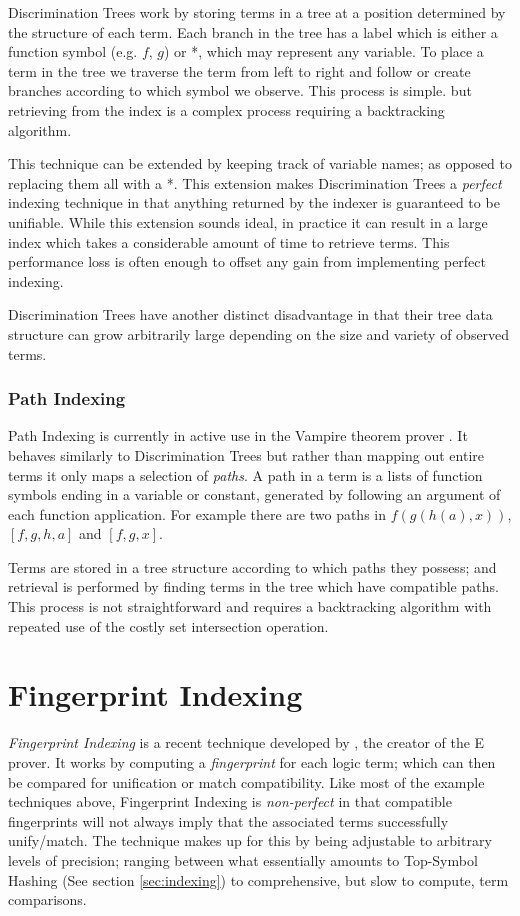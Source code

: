 Discrimination Trees work by storing terms in a tree at a position determined by the structure
of each term. Each branch in the tree has a label which is either a function symbol
(e.g. $f$, $g$) or *, which may represent any variable. To place a term in the tree
we traverse the term from left to right and follow or create branches according to
which symbol we observe. This process is simple. but retrieving from the index is a
complex process requiring a backtracking algorithm.

This technique can be extended by keeping track of variable names; as opposed to
replacing them all with a *. This extension makes Discrimination Trees a \emph{perfect} indexing technique in that anything
returned by the indexer is guaranteed to be unifiable\cite{mccune}. While this extension sounds
ideal, in practice it can result in a large index which takes
a considerable amount of time to retrieve terms. This performance
loss is often enough to offset any gain from implementing perfect indexing.

Discrimination Trees have another distinct disadvantage in that their tree data
structure can grow arbitrarily large depending on the size and variety of observed terms.

\subsubsection{Path Indexing}

Path Indexing is currently in active use in the Vampire theorem prover \cite{vampire}.
It behaves similarly to Discrimination Trees but rather than mapping out entire terms
it only maps a selection of \emph{paths}. A path in a term is a lists of function symbols
ending in a variable or constant, generated by following an argument of each function application.
For example there are two paths in $f(g(h(a), x))$, $[f, g, h, a]$ and $[f,g,x]$.

Terms are stored in a tree structure according to which paths they possess; and retrieval
is performed by finding terms in the tree which have compatible paths. This process
is not straightforward and requires a backtracking algorithm with repeated use of
the costly set intersection operation.

\section{Fingerprint Indexing}
\label{sec:fingerprint}

\emph{Fingerprint Indexing} is a recent technique developed by , the creator
of the E prover. It works by computing a \emph{fingerprint} for each logic term;
which can then be compared for unification or match compatibility. 
Like most of the example techniques above,
Fingerprint Indexing is \emph{non-perfect} in that compatible fingerprints will not
always imply that the associated terms successfully unify/match. The technique
makes up for this by being adjustable to arbitrary levels of precision; ranging between
what essentially amounts to Top-Symbol Hashing (See section \ref{sec:indexing})
to comprehensive, but slow to compute, term comparisons.

